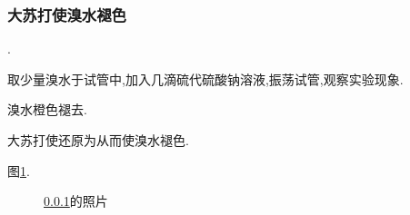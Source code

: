 \documentclass[hyperref,UTF8]{ctexart}
\begin{document}
\subsubsection{大苏打使溴水褪色}\label{82.151.94.69}

.

取少量溴水于试管中,加入几滴硫代硫酸钠溶液,振荡试管,观察实验现象.

溴水橙色褪去.

大苏打使还原为从而使溴水褪色.

图\ref{27.158.140.5}.

\begin{figure}[h]
    \centering
    \hspace{1in}
    \caption{\ref{82.151.94.69}的照片}
    \label{27.158.140.5}
\end{figure}
\end{document}

